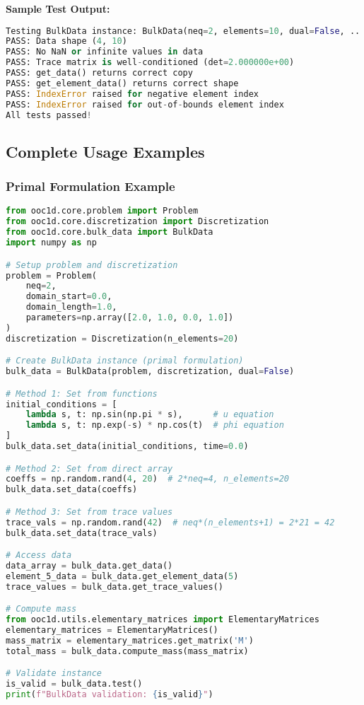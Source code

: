 \textbf{Sample Test Output:}
\begin{lstlisting}[language=Python, caption=Sample Test Output]
Testing BulkData instance: BulkData(neq=2, elements=10, dual=False, ...)
PASS: Data shape (4, 10)
PASS: No NaN or infinite values in data
PASS: Trace matrix is well-conditioned (det=2.000000e+00)
PASS: get_data() returns correct copy
PASS: get_element_data() returns correct shape
PASS: IndexError raised for negative element index
PASS: IndexError raised for out-of-bounds element index
All tests passed!
\end{lstlisting}

\subsection{Complete Usage Examples}
\label{subsec:complete_usage_examples}

\subsubsection{Primal Formulation Example}

\begin{lstlisting}[language=Python, caption=Complete Primal Usage Example]
from ooc1d.core.problem import Problem
from ooc1d.core.discretization import Discretization
from ooc1d.core.bulk_data import BulkData
import numpy as np

# Setup problem and discretization
problem = Problem(
    neq=2, 
    domain_start=0.0, 
    domain_length=1.0,
    parameters=np.array([2.0, 1.0, 0.0, 1.0])
)
discretization = Discretization(n_elements=20)

# Create BulkData instance (primal formulation)
bulk_data = BulkData(problem, discretization, dual=False)

# Method 1: Set from functions
initial_conditions = [
    lambda s, t: np.sin(np.pi * s),      # u equation
    lambda s, t: np.exp(-s) * np.cos(t)  # phi equation
]
bulk_data.set_data(initial_conditions, time=0.0)

# Method 2: Set from direct array
coeffs = np.random.rand(4, 20)  # 2*neq=4, n_elements=20
bulk_data.set_data(coeffs)

# Method 3: Set from trace values
trace_vals = np.random.rand(42)  # neq*(n_elements+1) = 2*21 = 42
bulk_data.set_data(trace_vals)

# Access data
data_array = bulk_data.get_data()
element_5_data = bulk_data.get_element_data(5)
trace_values = bulk_data.get_trace_values()

# Compute mass
from ooc1d.utils.elementary_matrices import ElementaryMatrices
elementary_matrices = ElementaryMatrices()
mass_matrix = elementary_matrices.get_matrix('M')
total_mass = bulk_data.compute_mass(mass_matrix)

# Validate instance
is_valid = bulk_data.test()
print(f"BulkData validation: {is_valid}")
\end{lstlisting}

